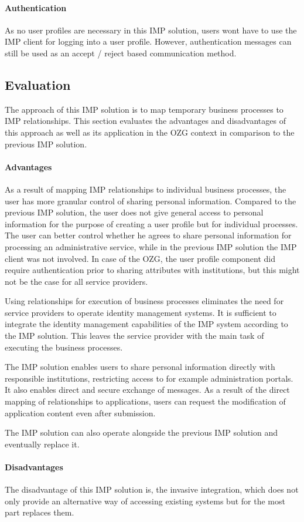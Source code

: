 \paragraph{Authentication}

As no user profiles are necessary in this IMP solution, users wont have to use the IMP client for logging into a user profile. However, authentication messages can still be used as an accept / reject based communication method.

\subsection{Evaluation}
The approach of this IMP solution is to map temporary business processes to IMP relationships. This section evaluates the advantages and disadvantages of this approach as well as its application in the OZG context in comparison to the previous IMP solution.

\paragraph{Advantages}

As a result of mapping IMP relationships to individual business processes, the user has more granular control of sharing personal information. Compared to the previous IMP solution, the user does not give general access to personal information for the purpose of creating a user profile but for individual processes. The user can better control whether he agrees to share personal information for processing an administrative service, while in the previous IMP solution the IMP client was not involved. In case of the OZG, the user profile component did require authentication prior to sharing attributes with institutions, but this might not be the case for all service providers.

Using relationships for execution of business processes eliminates the need for service providers to operate identity management systems. It is sufficient to integrate the identity management capabilities of the IMP system according to the IMP solution. This leaves the service provider with the main task of executing the business processes. 

The IMP solution enables users to share personal information directly with responsible institutions, restricting access to for example administration portals. It also enables direct and secure exchange of messages.
As a result of the direct mapping of relationships to applications, users can request the modification of application content even after submission.

The IMP solution can also operate alongside the previous IMP solution and eventually replace it.

\paragraph{Disadvantages}

The disadvantage of this IMP solution is, the invasive integration, which does not only provide an alternative way of accessing existing systems but for the most part replaces them.